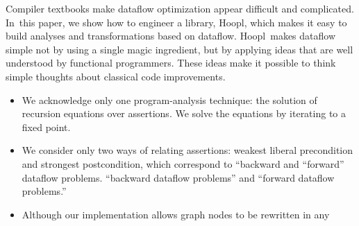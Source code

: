 \documentclass[blockstyle,preprint,natbib,nocopyrightspace]{sigplanconf}
\newcommand\ourlib{Hoopl}  %
\let\cite\citep
\def\authornote#1{\unskip\relax}
\newcommand{\simon}[1]{\authornote{SLPJ: #1}}
\newcommand{\norman}[1]{\authornote{NR: #1}}
\let\remark\norman
\def\finalremark#1{\relax}
\newcommand\secref[1]{Section~\ref{sec:#1}}
\begin{document}
Compiler textbooks make dataflow optimization appear
difficult and complicated.
In~this paper, we show how to engineer a library, \ourlib, which makes
it easy to build analyses and transformations based on dataflow.
\ourlib\ makes dataflow simple not by using a single magic
ingredient, but by applying ideas that are well understood by functional
programmers. %
These ideas
make it possible 
to think simple thoughts about classical code improvements.
\simon{It would be good to give cross-refs to plces in the paper that
substantiate these claims.}
\begin{itemize}
\item
We acknowledge only one program-analysis technique: the solution of
recursion equations over assertions.
We solve the equations by iterating to a fixed point.
\item
We consider only two
ways of relating assertions: weakest liberal precondition and strongest 
postcondition, which
 correspond 
to
\ifcutting
``backward and ``forward'' dataflow
problems.
\else
``backward dataflow problems'' and ``forward dataflow
problems.''
\fi
\finalremark
{Can we give an example of a property of program states which is
neither, just by way of contrast; ie this we cannot do.}
\item
Although our implementation allows graph nodes to be rewritten in any

\end{itemize}
\end{document}
